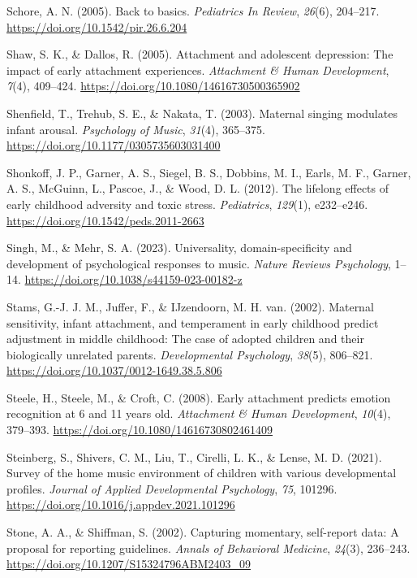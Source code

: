 \documentclass[
]{article}
\newlength{\cslhangindent}
\newenvironment{CSLReferences}[2] %
 {\begin{list}{}{%
  \setlength{\itemindent}{0pt}
  \setlength{\leftmargin}{0pt}
  \setlength{\parsep}{0pt}
  \ifodd #1
   \setlength{\leftmargin}{\cslhangindent}
   \setlength{\itemindent}{-1\cslhangindent}
  \fi
  \setlength{\itemsep}{#2\baselineskip}}}
 {\end{list}}
\begin{document}
\begin{CSLReferences}{1}{0}
Schore, A. N. (2005). Back to basics. \emph{Pediatrics In Review},
\emph{26}(6), 204--217. \url{https://doi.org/10.1542/pir.26.6.204}

Shaw, S. K., \& Dallos, R. (2005). Attachment and adolescent depression:
{The} impact of early attachment experiences. \emph{Attachment \& Human
Development}, \emph{7}(4), 409--424.
\url{https://doi.org/10.1080/14616730500365902}

Shenfield, T., Trehub, S. E., \& Nakata, T. (2003). Maternal singing
modulates infant arousal. \emph{Psychology of Music}, \emph{31}(4),
365--375. \url{https://doi.org/10.1177/0305735603031400}

Shonkoff, J. P., Garner, A. S., Siegel, B. S., Dobbins, M. I., Earls, M.
F., Garner, A. S., McGuinn, L., Pascoe, J., \& Wood, D. L. (2012). The
lifelong effects of early childhood adversity and toxic stress.
\emph{Pediatrics}, \emph{129}(1), e232--e246.
\url{https://doi.org/10.1542/peds.2011-2663}

Singh, M., \& Mehr, S. A. (2023). Universality, domain-specificity and
development of psychological responses to music. \emph{Nature Reviews
Psychology}, 1--14. \url{https://doi.org/10.1038/s44159-023-00182-z}

Stams, G.-J. J. M., Juffer, F., \& IJzendoorn, M. H. van. (2002).
Maternal sensitivity, infant attachment, and temperament in early
childhood predict adjustment in middle childhood: {The} case of adopted
children and their biologically unrelated parents. \emph{Developmental
Psychology}, \emph{38}(5), 806--821.
\url{https://doi.org/10.1037/0012-1649.38.5.806}

Steele, H., Steele, M., \& Croft, C. (2008). Early attachment predicts
emotion recognition at 6 and 11 years old. \emph{Attachment \& Human
Development}, \emph{10}(4), 379--393.
\url{https://doi.org/10.1080/14616730802461409}

Steinberg, S., Shivers, C. M., Liu, T., Cirelli, L. K., \& Lense, M. D.
(2021). Survey of the home music environment of children with various
developmental profiles. \emph{Journal of Applied Developmental
Psychology}, \emph{75}, 101296.
\url{https://doi.org/10.1016/j.appdev.2021.101296}

Stone, A. A., \& Shiffman, S. (2002). Capturing momentary, self-report
data: {A} proposal for reporting guidelines. \emph{Annals of Behavioral
Medicine}, \emph{24}(3), 236--243.
\url{https://doi.org/10.1207/S15324796ABM2403_09}


\end{CSLReferences}
\end{document}
